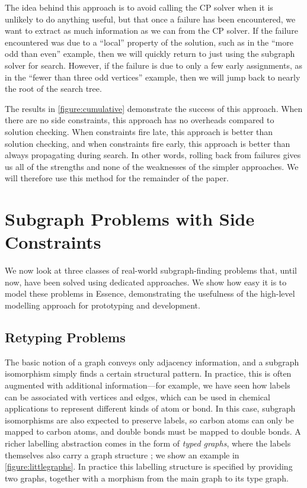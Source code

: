 \documentclass[runningheads]{llncs}
\begin{document}
The idea behind this approach is to avoid calling the CP solver when it is unlikely to do anything
useful, but that once a failure has been encountered, we want to extract as much information as we
can from the CP solver. If the failure encountered was due to a ``local'' property of the solution,
such as in the ``more odd than even'' example, then we will quickly return to just using the
subgraph solver for search. However, if the failure is due to only a few early assignments, as in
the ``fewer than three odd vertices'' example, then we will jump back to nearly the root of the
search tree.

The results in \cref{figure:cumulative} demonstrate the success of this approach. When there are no
side constraints, this approach has no overheads compared to solution checking. When constraints
fire late, this approach is better than solution checking, and when constraints fire early, this
approach is better than always propagating during search. In other words, rolling back from failures
gives us all of the strengths and none of the weaknesses of the simpler approaches. We will
therefore use this method for the remainder of the paper.

\section{Subgraph Problems with Side Constraints}\label{section:problems}

We now look at three classes of real-world subgraph-finding problems that, until now, have been
solved using dedicated approaches. We show how easy it is to model these problems in Essence,
demonstrating the usefulness of the high-level modelling approach for prototyping and development.

\subsection{Retyping Problems}\label{section:typegraphs}

The basic notion of a graph conveys only adjacency information, and a subgraph isomorphism simply
finds a certain structural pattern. In practice, this is often augmented with additional
information---for example, we have seen how labels can be associated with vertices and edges, which
can be used in chemical applications to represent different kinds of atom or bond. In this case,
subgraph isomorphisms are also expected to preserve labels, so carbon atoms can only be mapped to
carbon atoms, and double bonds must be mapped to double bonds.  A richer labelling abstraction comes
in the form of \emph{typed graphs}, where the labels themselves also carry a graph structure
\cite{Ehrig+06}; we show an example in \cref{figure:littlegraphs}. In practice this labelling
structure is specified by providing two graphs, together with a morphism from the main graph to its
type graph.
\end{document}

